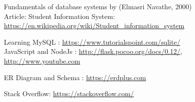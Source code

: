
\cleardoublepage
{}

\begin{thebibliography}{99}

\bibitem{}Fundamentals of database systems by (Elmasri Navathe, 2000)\\
Article: Student Information System: \url{https://en.wikipedia.org/wiki/Student_information_system}

\bibitem{} Learning MySQL : \url{https://www.tutorialspoint.com/sqlite/}\\
JavaScript and NodeJs : \url{http://flask.pocoo.org/docs/0.12/}, \url{http://www.youtube.com}

\bibitem{} ER Diagram and Schema : \url{https://erdplus.com}

\bibitem{} Stack Overflow: \url{https://stackoverflow.com/}

\end{thebibliography}